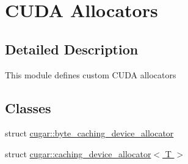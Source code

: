 \hypertarget{group___c_u_d_a_allocators_modules}{}\section{C\+U\+DA Allocators}
\label{group___c_u_d_a_allocators_modules}


\subsection{Detailed Description}
This module defines custom C\+U\+DA allocators \subsection*{Classes}
\begin{DoxyCompactItemize}
\item 
struct \hyperlink{structcugar_1_1byte__caching__device__allocator}{cugar\+::byte\+\_\+caching\+\_\+device\+\_\+allocator}
\item 
struct \hyperlink{structcugar_1_1caching__device__allocator}{cugar\+::caching\+\_\+device\+\_\+allocator$<$ T $>$}
\end{DoxyCompactItemize}
